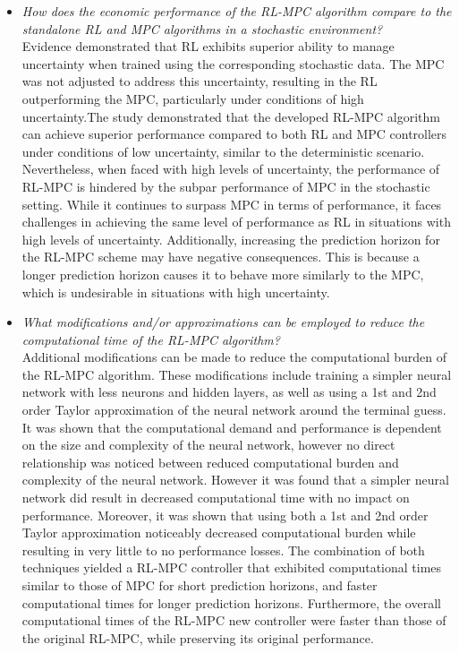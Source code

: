 \begin{itemize}[itemsep=7pt] %
	\item \textit{How does the economic performance of the RL-MPC algorithm compare to the standalone RL and MPC algorithms in a stochastic environment?} 
	\\Evidence demonstrated that RL exhibits superior ability to manage uncertainty when trained using the corresponding stochastic data. The MPC was not adjusted to address this uncertainty, resulting in the RL outperforming the MPC, particularly under conditions of high uncertainty.The study demonstrated that the developed RL-MPC algorithm can achieve superior performance compared to both RL and MPC controllers under conditions of low uncertainty, similar to the deterministic scenario. Nevertheless, when faced with high levels of uncertainty, the performance of RL-MPC is hindered by the subpar performance of MPC in the stochastic setting. While it continues to surpass MPC in terms of performance, it faces challenges in achieving the same level of performance as RL in situations with high levels of uncertainty. Additionally, increasing the prediction horizon for the RL-MPC scheme may have negative consequences. This is because a longer prediction horizon causes it to behave more similarly to the MPC, which is undesirable in situations with high uncertainty.
\end{itemize}

\begin{itemize}[itemsep=7pt] %
	\item \textit{What modifications and/or approximations can be employed to reduce the computational time of the RL-MPC algorithm?}
	\\  Additional modifications can be made to reduce the computational burden of the RL-MPC algorithm. These modifications include training a simpler neural network with less neurons and hidden layers, as well as using a 1st and 2nd order Taylor approximation of the neural network around the terminal guess. It was shown that the computational demand and performance is dependent on the size and complexity of the neural network, however no direct relationship was noticed between reduced computational burden and complexity of the neural network. However it was found that a simpler neural network did result in decreased computational time with no impact on performance. Moreover, it was shown that using both a 1st and 2nd order Taylor approximation noticeably decreased computational burden while resulting in very little to no performance losses. The combination of both techniques yielded a RL-MPC controller that exhibited computational times similar to those of MPC for short prediction horizons, and faster computational times for longer prediction horizons. Furthermore, the overall computational times of the RL-MPC new controller were faster than those of the original RL-MPC, while preserving its original performance. 
\end{itemize}

